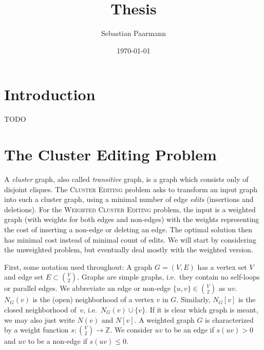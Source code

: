 \documentclass{article}
\title{Thesis}
\author{Sebastian Paarmann}
\date\today
\begin{document}
\maketitle

\tableofcontents

\section{Introduction}

TODO


\section{The Cluster Editing Problem}

A \emph{cluster} graph, also called \emph{transitive} graph, is a graph which consists only of
disjoint cliques. The \textsc{Cluster Editing} problem asks to transform an input graph into such a
cluster graph, using a minimal number of edge \emph{edits} (insertions and deletions). For the
\textsc{Weighted Cluster Editing} problem, the input is a weighted graph (with weights for both
edges and non-edges) with the weights representing the cost of inserting a non-edge or deleting an
edge. The optimal solution then has minimal cost instead of minimal count of edits. We will start by
considering the unweighted problem, but eventually deal mostly with the weighted version.



First, some notation used throughout: A graph $G = (V, E)$ has a vertex set $V$ and edge set $E
\subset \binom{V}{2}$. Graphs are simple graphs, i.e.\ they contain no self-loops or parallel edges.
We abbreviate an edge or non-edge $\{u, v\} \in \binom{V}{2}$ as $uv$.  $N_G(v)$ is the (open)
neighborhood of a vertex $v$ in $G$. Similarly, $N_G[v]$ is the closed neighborhood of~$v$, i.e.\
$N_G(v) \cup \{v\}$. If it is clear which graph is meant, we may also just write $N(v)$ and $N[v]$.
A weighted graph $G$ is characterized by a weight function $s\colon \binom{V}{2} \to \mathbb{Z}$. We
consider $uv$ to be an edge if $s(uv) > 0$ and $uv$ to be a non-edge if $s(uv) \leq 0$.
\end{document}
